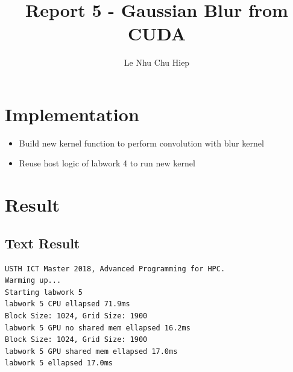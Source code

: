\documentclass{article}
\title{Report 5 - Gaussian Blur from CUDA}
\author{Le Nhu Chu Hiep}
\begin{document}
\maketitle

\section{Implementation}

\begin{itemize}
    \item Build new kernel function to perform convolution with blur kernel
    \item Reuse host logic of labwork 4 to run new kernel
\end{itemize}

\section{Result}

\subsection{Text Result}
\begin{verbatim}
USTH ICT Master 2018, Advanced Programming for HPC.
Warming up...
Starting labwork 5
labwork 5 CPU ellapsed 71.9ms
Block Size: 1024, Grid Size: 1900
labwork 5 GPU no shared mem ellapsed 16.2ms
Block Size: 1024, Grid Size: 1900
labwork 5 GPU shared mem ellapsed 17.0ms
labwork 5 ellapsed 17.0ms
\end{verbatim}
\end{document}

